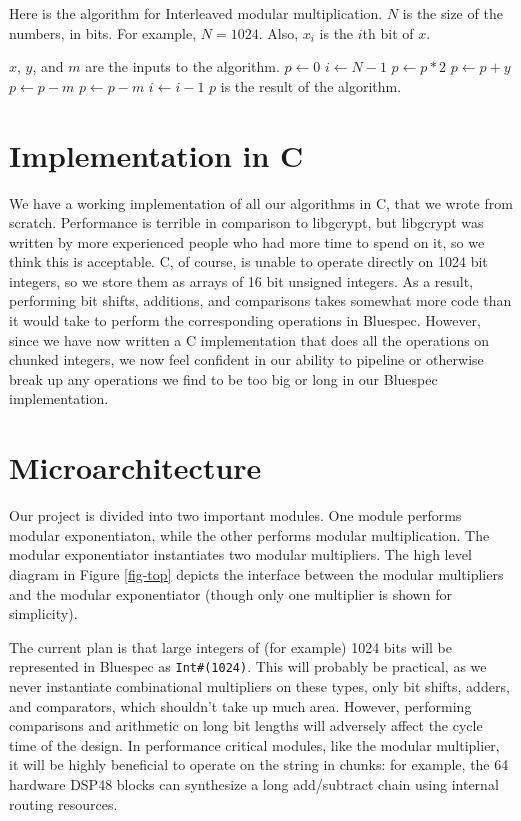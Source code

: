 \documentclass[12pt]{article}
\begin{document}
Here is the algorithm for Interleaved modular multiplication.
$N$ is the size of the numbers, in bits. For example, $N = 1024$.
Also, $x_i$ is the $i$th bit of $x$.
\begin{algorithmic}
\State $x$, $y$, and $m$ are the inputs to the algorithm.
\State $p \gets 0$
\State $i \gets N - 1$
	\State $p \gets p * 2$
		\State $p \gets p + y$
	\EndIf
		\State $p \gets p - m$
	\EndIf
		\State $p \gets p - m$
	\EndIf
  \State $i \gets i - 1$
\EndWhile
\State $p$ is the result of the algorithm.
\end{algorithmic}

\section{Implementation in C}
We have a working implementation of all our algorithms in C, that we wrote from scratch.
Performance is terrible in comparison to libgcrypt,
but libgcrypt was written by more experienced people who had more time to spend on it,
so we think this is acceptable.
C, of course, is unable to operate directly on 1024 bit integers,
so we store them as arrays of 16 bit unsigned integers.
As a result, performing bit shifts, additions, and comparisons
takes somewhat more code than it would take to perform the corresponding operations in Bluespec.
However, since we have now written a C implementation that does all the operations on chunked integers,
we now feel confident in our ability to pipeline or otherwise break up
any operations we find to be too big or long in our Bluespec implementation.

\section{Microarchitecture}
Our project is divided into two important modules.
One module performs modular exponentiaton,
while the other performs modular multiplication.
The modular exponentiator instantiates two modular multipliers.
The high level diagram in Figure \ref{fig-top} depicts the interface between
the modular multipliers and the modular exponentiator
(though only one multiplier is shown for simplicity).

The current plan is that large integers of (for example) 1024 bits
will be represented in Bluespec as {\tt Int\#(1024)}.
This will probably be practical, as we never instantiate combinational multipliers on these types,
only bit shifts, adders, and comparators, which shouldn't take up much area. However, performing
comparisons and arithmetic on long bit lengths will adversely affect the cycle time of the design.
In performance critical modules, like the modular multiplier, it will be highly beneficial
to operate on the string in chunks: for example, the 64 hardware DSP48 blocks can synthesize
a long add/subtract chain using internal routing resources. 
\end{document}
